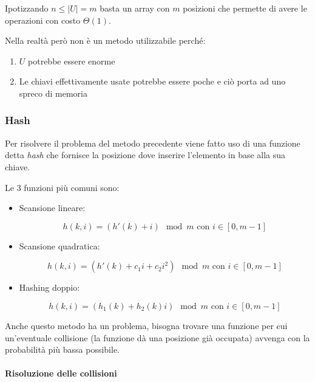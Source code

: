\documentclass{article}
\begin{document}
Ipotizzando $n\leq|U|=m$ basta un array con $m$ posizioni che permette di avere le operazioni con costo $\Theta(1)$.\newline

\noindent Nella realtà però non è un metodo utilizzabile perché:
\begin{enumerate}
    \item $U$ potrebbe essere enorme
    \item Le chiavi effettivamente usate potrebbe essere poche e ciò porta ad uno spreco di memoria\newline
\end{enumerate}

\subsubsection{Hash}

Per risolvere il problema del metodo precedente viene fatto uso di una funzione detta \textit{hash} che fornisce la posizione dove inserire l'elemento in base alla sua chiave.\newline

\noindent Le 3 funzioni più comuni sono:
\begin{itemize}
    \item Scansione lineare:

    $$h(k,i)=(h'(k)+i)\mod m\text{ 
 con } i\in[0,m-1]$$

    \item Scansione quadratica:

    $$h(k,i)=(h'(k)+c_1i+c_2i^2)\mod m\text{ 
 con } i\in[0,m-1]$$

    \item Hashing doppio:

    $$h(k,i)=(h_1(k)+h_2(k)i)\mod m\text{ 
 con } i\in[0,m-1]$$
    
\end{itemize}

\noindent Anche questo metodo ha un problema, bisogna trovare una funzione per cui un'eventuale collisione (la funzione dà una posizione già occupata) avvenga con la probabilità più bassa possibile.

\paragraph{Risoluzione delle collisioni} $\ $\newline
\end{document}
